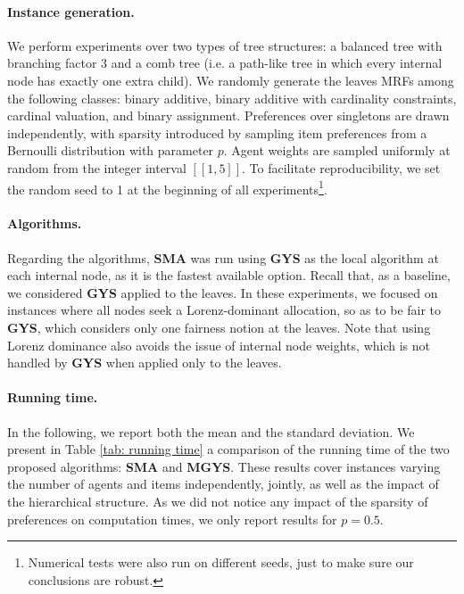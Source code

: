 \documentclass[]{article}
\begin{document}
\paragraph{Instance generation.} We perform experiments over two types of tree structures: a balanced tree with branching factor 3 and a comb tree (i.e. a path-like tree in which every internal node has exactly one extra child). We randomly generate the leaves MRFs among the following classes: binary additive, binary additive with cardinality constraints, cardinal valuation, and binary assignment. 
Preferences over singletons are drawn independently, with sparsity introduced by sampling item preferences from a Bernoulli distribution with parameter $p$.  Agent weights are sampled uniformly at random from the integer interval $[[1, 5]]$. 
To facilitate reproducibility, we set the random seed to 1 at the beginning of all experiments\footnote{Numerical tests were also run on different seeds, just to make sure our conclusions are robust.}. 

\paragraph{Algorithms.} Regarding the algorithms, {\bf SMA} was run using {\bf GYS} as the local algorithm at each internal node, as it is the fastest available option. Recall that, as a baseline, we considered {\bf GYS} applied to the leaves. In these experiments, we focused on instances where all nodes seek a Lorenz-dominant allocation, so as to be fair to \textbf{GYS}, which considers only one fairness notion at the leaves. Note that using Lorenz dominance also avoids the issue of internal node weights, which is not handled by {\bf GYS} when applied only to the leaves.

\paragraph{Running time.} In the following,  we report both the mean and the standard deviation. We present in Table  \ref{tab: running time} a comparison of the running time of the two proposed algorithms: {\bf SMA} and {\bf MGYS}. These results cover instances varying the number of agents and items independently, jointly, as well as the impact of the hierarchical structure. As we did not notice any impact of the sparsity of preferences on computation times, we only report results for $p = 0.5$.
\end{document}

